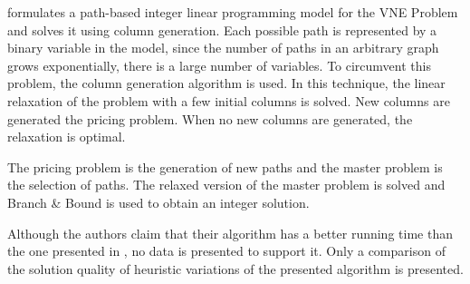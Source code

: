 


\citet{hu:2013} formulates a path-based integer linear programming model for the VNE Problem and solves it using column generation. Each possible path is represented by a binary variable in the model, since the number of paths in an arbitrary graph grows exponentially, there is a large number of variables. To circumvent this problem, the column generation algorithm is used. In this technique, the linear relaxation of the problem with a few initial columns is solved. New columns are generated the pricing problem. When no new columns are generated, the relaxation is optimal.\

The pricing problem is the generation of new paths and the master problem is the selection of paths. The relaxed version of the master problem is solved and Branch \& Bound is used to obtain an integer solution. 


Although the authors claim that their algorithm has a better running time than the one presented in \cite{Chowdhury2009}, no data is presented to support it. Only a comparison of the solution quality of heuristic variations of the presented algorithm is presented. 



